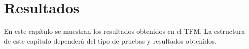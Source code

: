 \chapter{Resultados}

En este capítulo se muestran los resultados obtenidos en el TFM. La estructura de este capítulo dependerá del tipo de pruebas y resultados obtenidos. 
